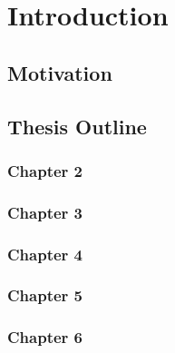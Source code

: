 \chapter{Introduction}      \label{Chapter:intro}


\section{Motivation}        \label{Chapter:intro/motivation}


\section{Thesis Outline}    \label{Chapter:intro/outline} 
    \subsection{Chapter 2}  \label{Chapter:intro/outline/chapter2}
    \subsection{Chapter 3}  \label{Chapter:intro/outline/chapter3}
    \subsection{Chapter 4}  \label{Chapter:intro/outline/chapter4}
    \subsection{Chapter 5}  \label{Chapter:intro/outline/chapter5}
    \subsection{Chapter 6}  \label{Chapter:intro/outline/chapter6}
